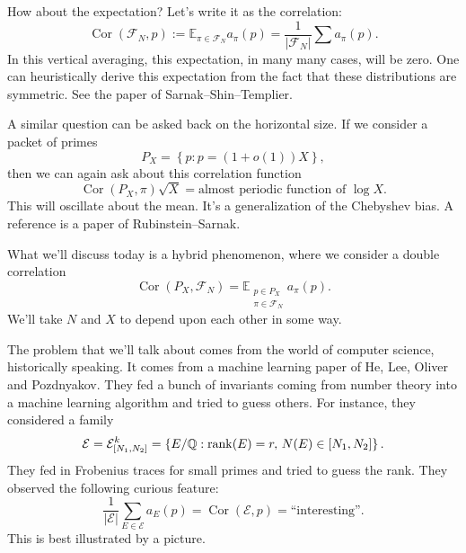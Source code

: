 \documentclass[reqno]{amsart} 
\begin{document}
How about the expectation?  Let's write it as the correlation:
\begin{equation*}
  \operatorname{Cor} (\mathcal{F}_N, p) := \mathbb{E}_{\pi \in \mathcal{F}_N } a_\pi (p)
  = \frac{1}{ \lvert \mathcal{F}_N  \rvert}
  \sum a_\pi (p).
\end{equation*}
In this vertical averaging, this expectation, in many many cases, will be zero.  One can heuristically derive this expectation from the fact that these distributions are symmetric.  See the paper of Sarnak--Shin--Templier.

A similar question can be asked back on the horizontal size.  If we consider a packet of primes
\begin{equation*}
  P_X = \left\{ p : p = (1 + o(1)) X \right\},
\end{equation*}
then we can again ask about this correlation function
\begin{equation*}
  \operatorname{Cor} (P_X , \pi )
  \sqrt{X}
  = \text{almost periodic function of } \log X.
\end{equation*}
This will oscillate about the mean.  It's a generalization of the Chebyshev bias.  A reference is a paper of Rubinstein--Sarnak.

What we'll discuss today is a hybrid phenomenon, where we consider a double correlation
\begin{equation*}
  \operatorname{Cor} (P_X, \mathcal{F}_N )
  =
  \mathbb{E}_{
    \substack{
      p \in P_X  \\
      \pi \in \mathcal{F}_N 
    }
  }
  a_\pi (p).
\end{equation*}
We'll take $N$ and $X$ to depend upon each other in some way.

The problem that we'll talk about comes from the world of computer science, historically speaking.  It comes from a machine learning paper of He, Lee, Oliver and Pozdnyakov.  They fed a bunch of invariants coming from number theory into a machine learning algorithm and tried to guess others.  For instance, they considered a family
\begin{equation*}
  \mathcal{E} = \mathcal{E}_{[N _1, N_2]}^k
  = \left\{ E / \mathbb{Q} : \operatorname{rank} (E) = r, \, N(E) \in [N_1, N_2] \right\}.
\end{equation*}
They fed in Frobenius traces for small primes and tried to guess the rank.  They observed the following curious feature:
\begin{equation*}
  \frac{1}{\lvert \mathcal{E}  \rvert}
  \sum_{E \in \mathcal{E} }
  a_E (p)
  = \operatorname{Cor} (\mathcal{E}, p)
  =
  \text{``interesting''}.
\end{equation*}
This is best illustrated by a picture.
\end{document}
